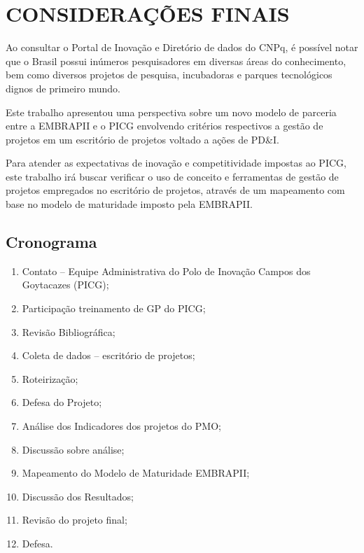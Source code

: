 \chapter{CONSIDERAÇÕES FINAIS}
\thispagestyle{empty}

Ao consultar o Portal de Inovação e Diretório de dados do CNPq, é possível notar que o Brasil possui inúmeros pesquisadores em diversas áreas do conhecimento, bem como diversos projetos de pesquisa, incubadoras e parques tecnológicos dignos de primeiro mundo.

Este trabalho apresentou uma perspectiva sobre um novo modelo de parceria entre a EMBRAPII e o PICG envolvendo critérios respectivos a gestão de projetos em um escritório de projetos voltado a ações de PD\&I.

Para atender as expectativas de inovação e competitividade impostas ao PICG, este trabalho irá buscar verificar o uso de conceito e ferramentas de gestão de projetos empregados no escritório de projetos, através de um mapeamento com base no modelo de maturidade imposto pela EMBRAPII.


\newpage
\thispagestyle{empty}
\singlespacing
\section{Cronograma}

\begin{enumerate}
  \item{Contato – Equipe Administrativa do Polo de Inovação Campos dos Goytacazes (PICG);}
  \item{Participação treinamento de GP do PICG;}
  \item{Revisão Bibliográfica;}
  \item{Coleta de dados – escritório de projetos;}
  \item{Roteirização;}
  \item{Defesa do Projeto;}
  \item{Análise dos Indicadores dos projetos do PMO;}
  \item{Discussão sobre análise;}
  \item{Mapeamento do Modelo de Maturidade EMBRAPII;}
  \item{Discussão dos Resultados;}
  \item{Revisão do projeto final;}
  \item{Defesa.}
\end{enumerate}

